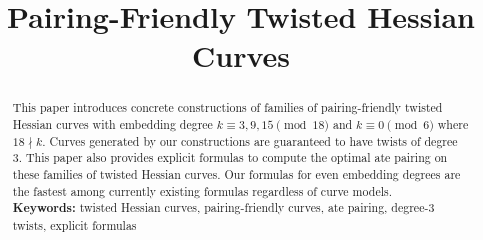 \documentclass[11pt,runningheads]{llncs}
\theoremstyle{definition}
\newif\ifpublic
\begin{document}
\title{Pairing-Friendly Twisted Hessian Curves}


\ifpublic
\author{
Chitchanok Chuengsatiansup\inst{1}
\and
Chloe Martindale\inst{2}
}
\authorrunning{Chuengsatiansup, Martindale}

\institute{
INRIA and ENS de Lyon\\
46 All\'{e}e d'Italie 69364 Lyon Cedex 07, France \\
\email{chitchanok.chuengsatiansup@ens-lyon.fr}
\and
Department of Mathematics and Computer Science\\
Technische Universiteit Eindhoven\\
P.O. Box 513, 5600 MB Eindhoven, The Netherlands\\
\email{c.r.martindale@tue.nl}
}
\fi


\date{}
\maketitle
\begin{abstract}
This paper introduces concrete constructions of families of pairing-friendly twisted Hessian curves
with embedding degree $k \equiv 3,9,15 \pmod{18}$ and $k \equiv 0 \pmod{6}$ where $18 \nmid k$.
Curves generated by our constructions are guaranteed to have twists of degree 3.
This paper also provides explicit formulas to compute the optimal ate pairing on these families of twisted Hessian curves.
Our formulas for even embedding degrees are the fastest among currently existing formulas regardless of curve models.
\\[10pt]
\textbf{Keywords:}
twisted Hessian curves, pairing-friendly curves, ate pairing, degree-3 twists, explicit formulas
\end{abstract}

\ifpublic
\begingroup
\makeatletter
\def\@thefnmark{} \@footnotetext{\relax
The first author acknowledges the support of Bpifrance
in the context of the national projet RISQ (P141580).
}
\endgroup
\fi






%



%
%
%


%






%
%
%
\end{document}

